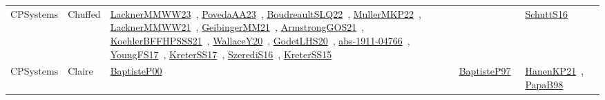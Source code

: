 {\begin{longtable}{lp{3cm}>{\raggedright\arraybackslash}p{6cm}>{\raggedright\arraybackslash}p{6cm}>{\raggedright\arraybackslash}p{8cm}}
CPSystems & Chuffed & \href{works/LacknerMMWW23.pdf}{LacknerMMWW23}~\cite{LacknerMMWW23}, \href{works/PovedaAA23.pdf}{PovedaAA23}~\cite{PovedaAA23}, \href{works/BoudreaultSLQ22.pdf}{BoudreaultSLQ22}~\cite{BoudreaultSLQ22}, \href{works/MullerMKP22.pdf}{MullerMKP22}~\cite{MullerMKP22}, \href{works/LacknerMMWW21.pdf}{LacknerMMWW21}~\cite{LacknerMMWW21}, \href{works/GeibingerMM21.pdf}{GeibingerMM21}~\cite{GeibingerMM21}, \href{works/ArmstrongGOS21.pdf}{ArmstrongGOS21}~\cite{ArmstrongGOS21}, \href{works/KoehlerBFFHPSSS21.pdf}{KoehlerBFFHPSSS21}~\cite{KoehlerBFFHPSSS21}, \href{works/WallaceY20.pdf}{WallaceY20}~\cite{WallaceY20}, \href{works/GodetLHS20.pdf}{GodetLHS20}~\cite{GodetLHS20}, \href{works/abs-1911-04766.pdf}{abs-1911-04766}~\cite{abs-1911-04766}, \href{works/YoungFS17.pdf}{YoungFS17}~\cite{YoungFS17}, \href{works/KreterSS17.pdf}{KreterSS17}~\cite{KreterSS17}, \href{works/SzerediS16.pdf}{SzerediS16}~\cite{SzerediS16}, \href{works/KreterSS15.pdf}{KreterSS15}~\cite{KreterSS15} &  & \href{works/SchuttS16.pdf}{SchuttS16}~\cite{SchuttS16}\\
CPSystems & Claire & \href{works/BaptisteP00.pdf}{BaptisteP00}~\cite{BaptisteP00} & \href{works/BaptisteP97.pdf}{BaptisteP97}~\cite{BaptisteP97} & \href{works/HanenKP21.pdf}{HanenKP21}~\cite{HanenKP21}, \href{works/PapaB98.pdf}{PapaB98}~\cite{PapaB98}\\

\end{longtable}}
